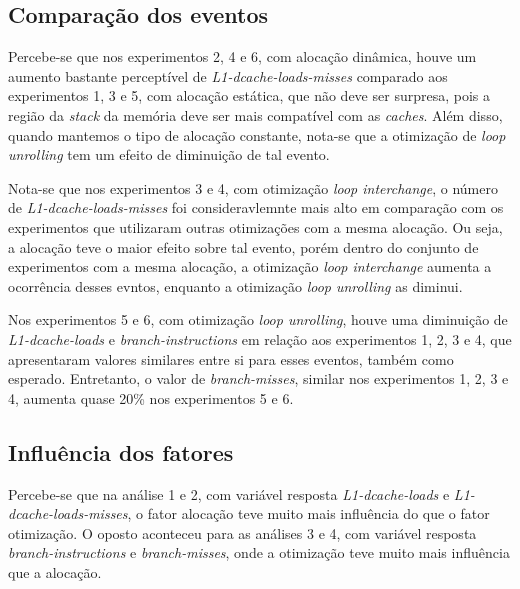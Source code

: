 \subsection{Comparação dos eventos}
Percebe-se que nos experimentos 2, 4 e 6, com alocação dinâmica, houve um aumento bastante perceptível de \textit{L1-dcache-loads-misses} comparado aos experimentos 1, 3 e 5, com alocação estática, que não deve ser surpresa, pois a região da \textit{stack} da memória deve ser mais compatível com as \textit{caches}. Além disso, quando mantemos o tipo de alocação constante, nota-se que a otimização de \textit{loop unrolling} tem um efeito de diminuição de tal evento.

Nota-se que nos experimentos 3 e 4, com otimização \textit{loop interchange}, o número de \textit{L1-dcache-loads-misses} foi consideravlemnte mais alto em comparação com os experimentos que utilizaram outras otimizações com a mesma alocação. Ou seja, a alocação teve o maior efeito sobre tal evento, porém dentro do conjunto de experimentos com a mesma alocação, a otimização \textit{loop interchange} aumenta a ocorrência desses evntos, enquanto a otimização \textit{loop unrolling} as diminui.

Nos experimentos 5 e 6, com otimização \textit{loop unrolling}, houve uma diminuição de \textit{L1-dcache-loads} e \textit{branch-instructions} em relação aos experimentos 1, 2, 3 e 4, que apresentaram valores similares entre si para esses eventos, também como esperado. Entretanto, o valor de \textit{branch-misses}, similar nos experimentos 1, 2, 3 e 4, aumenta quase 20\% nos experimentos 5 e 6.


\subsection{Influência dos fatores}
Percebe-se que na análise 1 e 2, com variável resposta \textit{L1-dcache-loads} e \textit{L1-dcache-loads-misses}, o fator alocação teve muito mais influência do que o fator otimização. O oposto aconteceu para as análises 3 e 4, com variável resposta \textit{branch-instructions} e \textit{branch-misses}, onde a otimização teve muito mais influência que a alocação.

